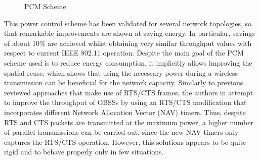 \documentclass[12pt, a4paper,twoside]{tesi_upf}
\begin{document}
				\begin{figure}[h!]
					\centering
					\caption{PCM Scheme}
					\label{fig:pcm}
				\end{figure}
				This power control scheme has been validated for several network topologies, so that remarkable improvements are shown at saving energy. In particular, savings of about 10\% are achieved whilst obtaining very similar throughput values with respect to current IEEE 802.11 operation. Despite the main goal of the PCM scheme used is to reduce energy consumption, it implicitly allows improving the spatial reuse, which shows that using the necessary power during a wireless transmission can be beneficial for the network capacity. Similarly to previous reviewed approaches that make use of RTS/CTS frames, the authors in \cite{lei2015performance} attempt to improve the throughput of OBSSs by using an RTS/CTS modification that incorporates different Network Allocation Vector (NAV) timers. Thus, despite RTS and CTS packets are transmitted at the maximum power, a higher number of parallel transmissions can be carried out, since the new NAV timers only captures the RTS/CTS operation. However, this solutions appears to be quite rigid and to behave properly only in few situations.
				
\end{document}
